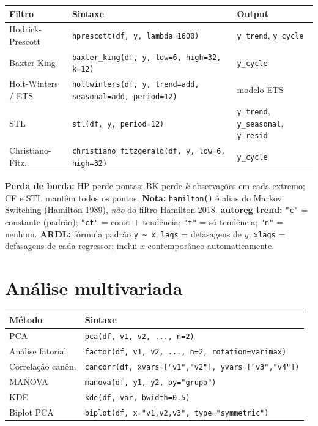 \begin{center}
\begin{tabular}{lll}
\toprule
\textbf{Filtro} & \textbf{Sintaxe} & \textbf{Output} \\
\midrule
Hodrick-Prescott   & \texttt{hprescott(df, y, lambda=1600)}       & \texttt{y\_trend}, \texttt{y\_cycle} \\
Baxter-King        & \texttt{baxter\_king(df, y, low=6, high=32, k=12)} & \texttt{y\_cycle} \\
Holt-Winters / ETS & \texttt{holtwinters(df, y, trend=add, seasonal=add, period=12)} & modelo ETS \\
STL                & \texttt{stl(df, y, period=12)}               & \texttt{y\_trend}, \texttt{y\_seasonal}, \texttt{y\_resid} \\
Christiano-Fitz.   & \texttt{christiano\_fitzgerald(df, y, low=6, high=32)} & \texttt{y\_cycle} \\
\bottomrule
\end{tabular}
\end{center}

{\footnotesize \textbf{Perda de borda:} HP perde pontas; BK perde $k$ observações em cada extremo;
CF e STL mantêm todos os pontos.
\textbf{Nota:} \texttt{hamilton()} é alias do Markov Switching (Hamilton 1989),
\emph{não} do filtro Hamilton 2018.
\textbf{autoreg trend:} \texttt{"c"} = constante (padrão);
\texttt{"ct"} = const + tendência; \texttt{"t"} = só tendência; \texttt{"n"} = nenhum.
\textbf{ARDL:} fórmula padrão \texttt{y \textasciitilde{} x}; \texttt{lags} = defasagens de $y$;
\texttt{xlags} = defasagens de cada regressor; inclui $x$ contemporâneo automaticamente.}

\section{Análise multivariada}

\begin{center}
\begin{tabular}{ll}
\toprule
\textbf{Método} & \textbf{Sintaxe} \\
\midrule
PCA               & \texttt{pca(df, v1, v2, ..., n=2)} \\
Análise fatorial  & \texttt{factor(df, v1, v2, ..., n=2, rotation=varimax)} \\
Correlação canôn. & \texttt{cancorr(df, xvars=["v1","v2"], yvars=["v3","v4"])} \\
MANOVA            & \texttt{manova(df, y1, y2, by="grupo")} \\
KDE               & \texttt{kde(df, var, bwidth=0.5)} \\
Biplot PCA        & \texttt{biplot(df, x="v1,v2,v3", type="symmetric")} \\
\bottomrule
\end{tabular}
\end{center}

